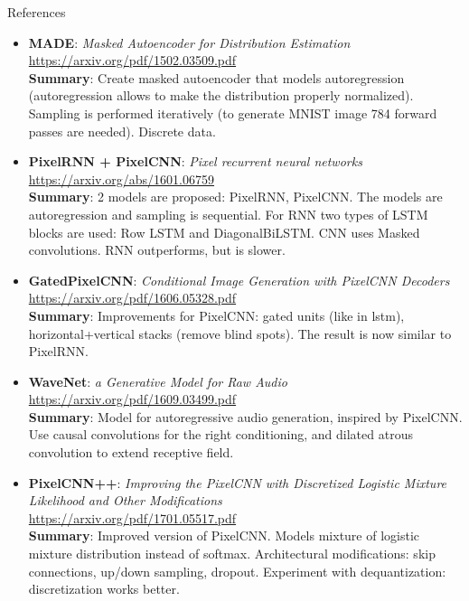 \begin{frame}{References}
{\tiny
\begin{itemize}
	\item \textbf{MADE}: \textit{Masked Autoencoder for Distribution Estimation} \\
	\href{https://arxiv.org/pdf/1502.03509.pdf}{https://arxiv.org/pdf/1502.03509.pdf} \\
	\textbf{Summary}: Create masked autoencoder that models autoregression (autoregression allows to make the distribution properly normalized). Sampling is performed iteratively (to generate MNIST image 784 forward passes are needed). Discrete data.
	
	\item \textbf{PixelRNN + PixelCNN}: \textit{Pixel recurrent neural networks} \\
	\href{https://arxiv.org/abs/1601.06759}{https://arxiv.org/abs/1601.06759} \\
	\textbf{Summary}: 2 models are proposed: PixelRNN, PixelCNN. The models are autoregression and sampling is sequential. For RNN two types of LSTM blocks are used: Row LSTM and DiagonalBiLSTM. CNN uses Masked convolutions. RNN outperforms, but is slower.
	
	\item \textbf{GatedPixelCNN}: \textit{Conditional Image Generation with PixelCNN Decoders} \\
	\href{https://arxiv.org/pdf/1606.05328.pdf}{https://arxiv.org/pdf/1606.05328.pdf} \\
	\textbf{Summary}: Improvements for PixelCNN: gated units (like in lstm), horizontal+vertical stacks (remove blind spots). The result is now similar to PixelRNN.
	
	\item \textbf{WaveNet}: \textit{a Generative Model for Raw Audio} \\
	\href{https://arxiv.org/pdf/1609.03499.pdf}{https://arxiv.org/pdf/1609.03499.pdf} \\
	\textbf{Summary}: Model for autoregressive audio generation, inspired by PixelCNN. Use causal convolutions for the right conditioning, and dilated atrous convolution to extend receptive field.
	
	\item \textbf{PixelCNN++}: \textit{Improving the PixelCNN with Discretized Logistic Mixture Likelihood and Other Modifications} \\
	\href{https://arxiv.org/pdf/1701.05517.pdf}{https://arxiv.org/pdf/1701.05517.pdf} \\
	\textbf{Summary}: Improved version of PixelCNN. Models mixture of logistic mixture distribution instead of softmax. Architectural modifications: skip connections, up/down sampling, dropout. Experiment with dequantization: discretization works better.
	

\end{itemize}}
\end{frame}
